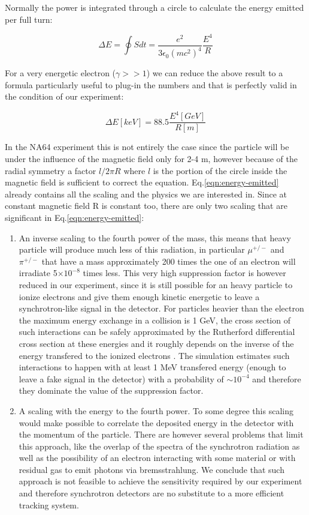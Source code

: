 Normally the power is integrated through a circle to calculate the energy emitted per full turn:

\begin{equation}
\Delta E = \oint S dt = \frac{e^2}{3\epsilon_0(mc^2)^4}\frac{E^4}{R}
\label{eqn:energy-emitted}
\end{equation}

For a very energetic electron ($\gamma >> 1$) we can reduce the above result to a formula particularly useful to plug-in the numbers and that is perfectly valid in the condition of our experiment:

\begin{equation}
\Delta E[keV] = 88.5\frac{E^4[GeV]}{R[m]}
\label{eqn:energy-emitted-simp}
\end{equation}

In the NA64 experiment this is not entirely the case since the particle will be under the influence of the magnetic field only for 2-4 \si{\meter}, however because of the radial symmetry a factor $l/2\pi R$ where $l$ is the portion of the circle inside the magnetic field is sufficient to correct the equation. Eq.\ref{eqn:energy-emitted} already contains all the scaling and the physics we are interested in.
 Since at constant magnetic field R is constant too, there are only two scaling that are significant in Eq.\ref{eqn:energy-emitted}:
 \begin{enumerate}
 \item An inverse scaling to the fourth power of the mass, this means that heavy particle will produce much less of this radiation, in particular $\mu^{+/-}$ and $\pi^{+/-}$ that have a mass approximately 200 times the one of an electron will irradiate 5$\times 10^{-8}$ times less. This very high suppression factor is however reduced in our experiment, since it is still possible for an heavy particle to ionize electrons and give them enough kinetic energetic to leave a synchrotron-like signal in the detector. For particles heavier than the electron the maximum energy exchange in a collision is 1 GeV, the cross section of such interactions can be safely approximated by the Rutherford differential cross section at these energies and it roughly depends on the inverse of the energy transfered to the ionized electrons \cite{review-particle-physics}. The simulation estimates such interactions to happen with at least 1 MeV transfered energy (enough to leave a fake signal in the detector) with a probability of $\sim 10^{-4}$ and therefore they dominate the value of the suppression factor.
 \item A scaling with the energy to the fourth power. To some degree this scaling would make possible to correlate the deposited energy in the detector with the momentum of the particle. There are however several problems that limit this approach, like the overlap of the spectra of the synchrotron radiation as well as the possibility of an electron interacting with some material or with residual gas to emit photons via bremsstrahlung. We conclude that such approach is not feasible to achieve the sensitivity required by our experiment and therefore synchrotron detectors are no substitute to a more efficient tracking system.
 \end{enumerate}
 
